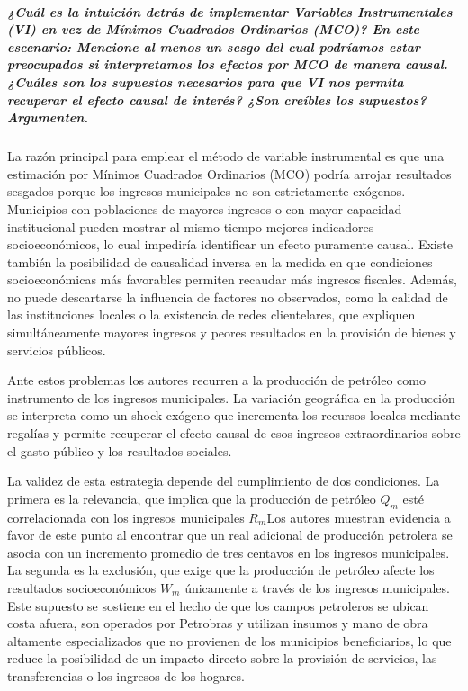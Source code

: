 \documentclass[
]{article}
\begin{document}
\subparagraph{¿Cuál es la intuición detrás de implementar Variables
Instrumentales (VI) en vez de Mínimos Cuadrados Ordinarios (MCO)? En
este escenario: Mencione al menos un sesgo del cual podríamos estar
preocupados si interpretamos los efectos por MCO de manera causal.
¿Cuáles son los supuestos necesarios para que VI nos permita recuperar
el efecto causal de interés? ¿Son creíbles los supuestos?
Argumenten.}\label{cuuxe1l-es-la-intuiciuxf3n-detruxe1s-de-implementar-variables-instrumentales-vi-en-vez-de-muxednimos-cuadrados-ordinarios-mco-en-este-escenario-mencione-al-menos-un-sesgo-del-cual-podruxedamos-estar-preocupados-si-interpretamos-los-efectos-por-mco-de-manera-causal.-cuuxe1les-son-los-supuestos-necesarios-para-que-vi-nos-permita-recuperar-el-efecto-causal-de-interuxe9s-son-creuxedbles-los-supuestos-argumenten.}

La razón principal para emplear el método de variable instrumental es
que una estimación por Mínimos Cuadrados Ordinarios (MCO) podría arrojar
resultados sesgados porque los ingresos municipales no son estrictamente
exógenos. Municipios con poblaciones de mayores ingresos o con mayor
capacidad institucional pueden mostrar al mismo tiempo mejores
indicadores socioeconómicos, lo cual impediría identificar un efecto
puramente causal. Existe también la posibilidad de causalidad inversa en
la medida en que condiciones socioeconómicas más favorables permiten
recaudar más ingresos fiscales. Además, no puede descartarse la
influencia de factores no observados, como la calidad de las
instituciones locales o la existencia de redes clientelares, que
expliquen simultáneamente mayores ingresos y peores resultados en la
provisión de bienes y servicios públicos.

Ante estos problemas los autores recurren a la producción de petróleo
como instrumento de los ingresos municipales. La variación geográfica en
la producción se interpreta como un shock exógeno que incrementa los
recursos locales mediante regalías y permite recuperar el efecto causal
de esos ingresos extraordinarios sobre el gasto público y los resultados
sociales.

La validez de esta estrategia depende del cumplimiento de dos
condiciones. La primera es la relevancia, que implica que la producción
de petróleo \(Q_m\)\hspace{0pt} esté correlacionada con los ingresos
municipales \(R_m\)Los autores muestran evidencia a favor de este punto
al encontrar que un real adicional de producción petrolera se asocia con
un incremento promedio de tres centavos en los ingresos municipales. La
segunda es la exclusión, que exige que la producción de petróleo afecte
los resultados socioeconómicos \(W_m\) únicamente a través de los
ingresos municipales. Este supuesto se sostiene en el hecho de que los
campos petroleros se ubican costa afuera, son operados por Petrobras y
utilizan insumos y mano de obra altamente especializados que no
provienen de los municipios beneficiarios, lo que reduce la posibilidad
de un impacto directo sobre la provisión de servicios, las
transferencias o los ingresos de los hogares.
\end{document}

